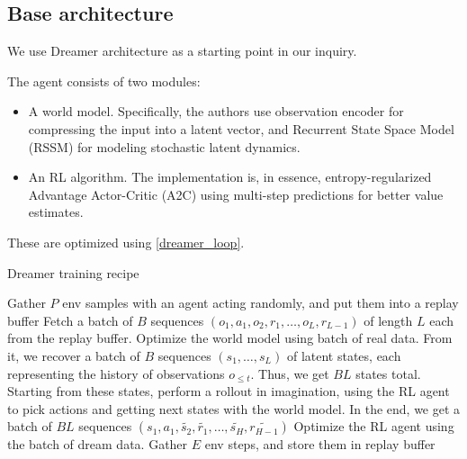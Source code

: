 \documentclass[twoside,11pt]{article}
\begin{document}
\subsection{Base architecture}

We use Dreamer architecture as a starting point in our inquiry.

The agent consists of two modules:

\begin{itemize}
    \item A world model. Specifically, the authors use observation encoder for compressing the input into a latent vector, and Recurrent State Space Model (RSSM) for modeling stochastic latent dynamics.
    \item An RL algorithm. The implementation is, in essence, entropy-regularized Advantage Actor-Critic (A2C) using multi-step predictions for better value estimates.
\end{itemize}

These are optimized using \ref{dreamer_loop}.

\begin{algorithm}
    \caption{Dreamer training recipe}
    \label{dreamer_loop}
    \begin{algorithmic}[1]
        \State Gather $P$ env samples with an agent acting randomly, and put them into a replay buffer
        \State Fetch a batch of $B$ sequences $(o_1, a_1, o_2, r_1, \ldots, o_{L}, r_{L-1})$ of length $L$ each from the replay buffer.
        \State Optimize the world model using batch of real data. From it, we recover a batch of $B$ sequences $(s_1, \ldots, s_L)$ of latent states, each representing the history of observations $o_{\leq t}$. Thus, we get $BL$ states total.
        \State Starting from these states, perform a rollout in imagination, using the RL agent to pick actions and getting next states with the world model. In the end, we get a batch of $BL$ sequences $(s_1, a_1, \widetilde{s_2}, \widetilde{r_1}, \ldots, \widetilde{s_H}, \widetilde{r_{H-1}})$
        \State Optimize the RL agent using the batch of dream data.
        \State Gather $E$ env steps, and store them in replay buffer
        \EndWhile
    \end{algorithmic}
\end{algorithm}


\vskip 0.2in

\end{document}
